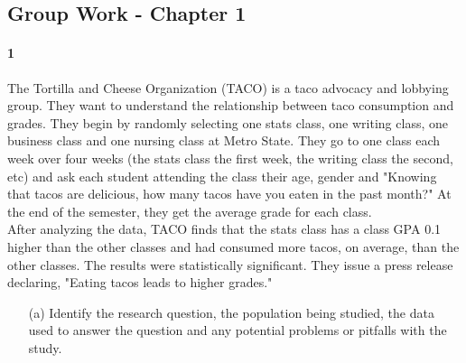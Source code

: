 \documentclass{article}
\begin{document}
\begin{flushleft}
\section*{Group Work - Chapter 1}
\paragraph{1} The Tortilla and Cheese Organization (TACO) is a taco advocacy and lobbying group. They want to understand the relationship between taco consumption and grades. They begin by randomly selecting one stats class, one writing class, one business class and one nursing class at Metro State. They go to one class each week over four weeks (the stats class the first week, the writing class the second, etc) and ask each student attending the class their age, gender and "Knowing that tacos are delicious, how many tacos have you eaten in the past month?" At the end of the semester, they get the average grade for each class.\\
\medskip
After analyzing the data, TACO finds that the stats class has a class GPA 0.1 higher than the other classes and had consumed more tacos, on average, than the other classes. The results were statistically significant. They issue a press release declaring, "Eating tacos leads to higher grades."

\begin{itemize}
\item [(a)] Identify the research question, the population being studied, the data used to answer the question and any potential problems or pitfalls with the study.\\
\medskip
{}\\
\medskip{}\\
\medskip{}\\
\medskip{}
\vspace{.25in}


\end{itemize}
\end{flushleft}
\end{document}

